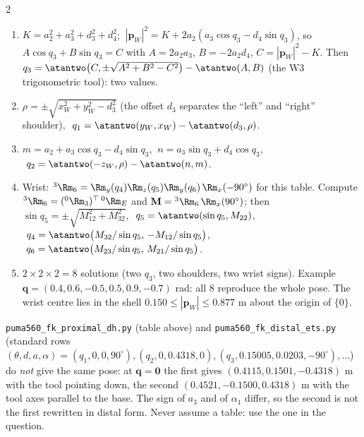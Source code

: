 \begin{multicols}{2}
\begin{fbx}
\begin{symbols}
\end{symbols}
\end{fbx}
\begin{recipe}
\begin{enumerate}
\item $K=a_2^2+a_3^2+d_3^2+d_4^2$; $\ |\mathbf p_W|^2=K+2a_2(a_3\cos q_3-d_4\sin q_3)$, so $A\cos q_3+B\sin q_3=C$ with $A=2a_2a_3$, $B=-2a_2d_4$, $C=|\mathbf p_W|^2-K$. Then $q_3=\atantwo\big(C,\pm\sqrt{A^2+B^2-C^2}\big)-\atantwo(A,B)$ (the W3 trigonometric tool): two values.
\item $\rho=\pm\sqrt{x_W^2+y_W^2-d_3^2}$ (the offset $d_3$ separates the ``left'' and ``right'' shoulder), $\ q_1=\atantwo(y_W,x_W)-\atantwo(d_3,\rho)$.
\item $m=a_2+a_3\cos q_3-d_4\sin q_3$, $\ n=a_3\sin q_3+d_4\cos q_3$, $\ q_2=\atantwo(-z_W,\rho)-\atantwo(n,m)$.
\item Wrist: ${}^3\Rm_6=\Rm_y(q_4)\Rm_z(q_5)\Rm_y(q_6)\,\Rm_x(-90^\circ)$ for this table. Compute ${}^3\Rm_6=({}^0\Rm_3)^\top\,{}^0\Rm_E$ and $\mathbf M={}^3\Rm_6\,\Rm_x(90^\circ)$; then $\sin q_5=\pm\sqrt{M_{12}^2+M_{32}^2}$, $\ q_5=\atantwo(\sin q_5,M_{22})$, $\ q_4=\atantwo\big(M_{32}/\sin q_5,\,-M_{12}/\sin q_5\big)$, $\ q_6=\atantwo\big(M_{23}/\sin q_5,\,M_{21}/\sin q_5\big)$.
\item $2\times2\times2=8$ solutions (two $q_3$, two shoulders, two wrist signs). Example $\mathbf q=(0.4,0.6,-0.5,0.5,0.9,-0.7)$ rad: all 8 reproduce the whole pose. The wrist centre lies in the shell $0.150\le|\mathbf p_W|\le0.877$ m about the origin of $\{0\}$. \chk
\end{enumerate}
\end{recipe}
\begin{slideerr}
\texttt{puma560\_fk\_proximal\_dh.py} (table above) and \texttt{puma560\_fk\_distal\_ets.py} (standard rows $(\theta,d,a,\alpha)=(q_1,0,0,90^\circ),(q_2,0,0.4318,0),(q_3,0.15005,0.0203,-90^\circ),\dots$) do \emph{not} give the same pose: at $\mathbf q=\mathbf 0$ the first gives $(0.4115,0.1501,-0.4318)$ m with the tool pointing down, the second $(0.4521,-0.1500,0.4318)$ m with the tool axes parallel to the base. The sign of $a_3$ and of $\alpha_1$ differ, so the second is not the first rewritten in distal form. Never assume a table: use the one in the question. \chk
\end{slideerr}


\end{multicols}
